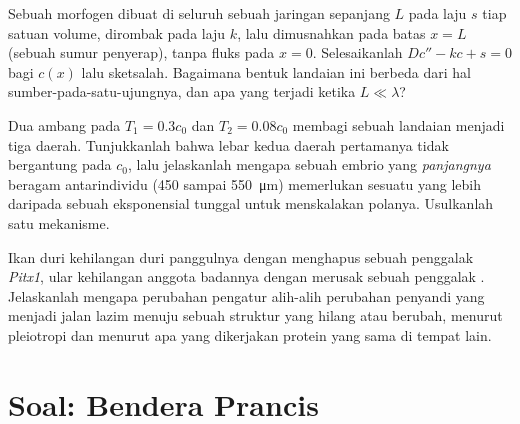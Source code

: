 \begin{exercise}[$\star\star\star$]\label{exo:b3:developmental-genetics:10}
Sebuah morfogen dibuat di seluruh sebuah jaringan sepanjang $L$ pada laju $s$ tiap
satuan volume, dirombak pada laju $k$, lalu dimusnahkan pada batas $x =
L$ (sebuah sumur penyerap), tanpa fluks pada $x = 0$. Selesaikanlah $Dc'' - kc + s =
0$ bagi $c(x)$ lalu sketsalah. Bagaimana bentuk landaian ini berbeda dari
hal sumber-pada-satu-ujungnya, dan apa yang terjadi ketika $L \ll \lambda$?
\end{exercise}

\begin{exercise}[$\star\star\star$]\label{exo:b3:developmental-genetics:11}
Dua ambang pada $T_{1} = 0.3c_{0}$ dan $T_{2} = 0.08c_{0}$ membagi sebuah
landaian menjadi tiga daerah. Tunjukkanlah bahwa lebar kedua daerah pertamanya
tidak bergantung pada $c_{0}$, lalu jelaskanlah mengapa sebuah embrio yang
\emph{panjangnya} beragam antarindividu (\qty{450}{} sampai
\qty{550}{\micro m}) memerlukan sesuatu yang lebih daripada sebuah eksponensial tunggal untuk
menskalakan polanya. Usulkanlah satu mekanisme.
\end{exercise}

\begin{exercise}[$\star\star\star$]\label{exo:b3:developmental-genetics:12}
Ikan duri kehilangan duri panggulnya dengan menghapus sebuah penggalak \emph{Pitx1},
ular kehilangan anggota badannya dengan merusak sebuah penggalak \emph{}. Jelaskanlah
mengapa perubahan pengatur alih-alih perubahan penyandi yang menjadi jalan lazim
menuju sebuah struktur yang hilang atau berubah, menurut pleiotropi dan menurut apa yang
dikerjakan protein yang sama di tempat lain.
\end{exercise}

\section{Soal: Bendera Prancis}

